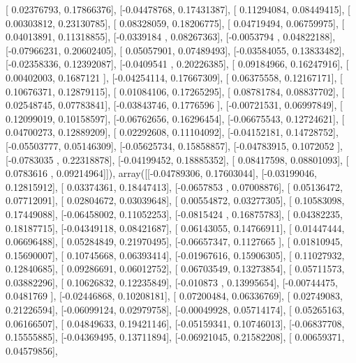 \documentclass{article}
\begin{document}
       [ 0.02376793,  0.17866376],
       [-0.04478768,  0.17431387],
       [ 0.11294084,  0.08449415],
       [ 0.00303812,  0.23130785],
       [ 0.08328059,  0.18206775],
       [ 0.04719494,  0.06759975],
       [ 0.04013891,  0.11318855],
       [-0.0339184 ,  0.08267363],
       [-0.0053794 ,  0.04822188],
       [-0.07966231,  0.20602405],
       [ 0.05057901,  0.07489493],
       [-0.03584055,  0.13833482],
       [-0.02358336,  0.12392087],
       [-0.0409541 ,  0.20226385],
       [ 0.09184966,  0.16247916],
       [ 0.00402003,  0.1687121 ],
       [-0.04254114,  0.17667309],
       [ 0.06375558,  0.12167171],
       [ 0.10676371,  0.12879115],
       [ 0.01084106,  0.17265295],
       [ 0.08781784,  0.08837702],
       [ 0.02548745,  0.07783841],
       [-0.03843746,  0.1776596 ],
       [-0.00721531,  0.06997849],
       [ 0.12099019,  0.10158597],
       [-0.06762656,  0.16296454],
       [-0.06675543,  0.12724621],
       [ 0.04700273,  0.12889209],
       [ 0.02292608,  0.11104092],
       [-0.04152181,  0.14728752],
       [-0.05503777,  0.05146309],
       [-0.05625734,  0.15858857],
       [-0.04783915,  0.1072052 ],
       [-0.0783035 ,  0.22318878],
       [-0.04199452,  0.18885352],
       [ 0.08417598,  0.08801093],
       [ 0.0783616 ,  0.09214964]]), array([[-0.04789306,  0.17603044],
       [-0.03199046,  0.12815912],
       [ 0.03374361,  0.18447413],
       [-0.0657853 ,  0.07008876],
       [ 0.05136472,  0.07712091],
       [ 0.02804672,  0.03039648],
       [ 0.00554872,  0.03277305],
       [ 0.10583098,  0.17449088],
       [-0.06458002,  0.11052253],
       [-0.0815424 ,  0.16875783],
       [ 0.04382235,  0.18187715],
       [-0.04349118,  0.08421687],
       [ 0.06143055,  0.14766911],
       [ 0.01447444,  0.06696488],
       [ 0.05284849,  0.21970495],
       [-0.06657347,  0.1127665 ],
       [ 0.01810945,  0.15690007],
       [ 0.10745668,  0.06393414],
       [-0.01967616,  0.15906305],
       [ 0.11027932,  0.12840685],
       [ 0.09286691,  0.06012752],
       [ 0.06703549,  0.13273854],
       [ 0.05711573,  0.03882296],
       [ 0.10626832,  0.12235849],
       [-0.010873  ,  0.13995654],
       [-0.00744475,  0.0481769 ],
       [-0.02446868,  0.10208181],
       [ 0.07200484,  0.06336769],
       [ 0.02749083,  0.21226594],
       [-0.06099124,  0.02979758],
       [-0.00049928,  0.05714174],
       [ 0.05265163,  0.06166507],
       [ 0.04849633,  0.19421146],
       [-0.05159341,  0.10746013],
       [-0.06837708,  0.15555885],
       [-0.04369495,  0.13711894],
       [-0.06921045,  0.21582208],
       [ 0.00659371,  0.04579856],
\end{document}
